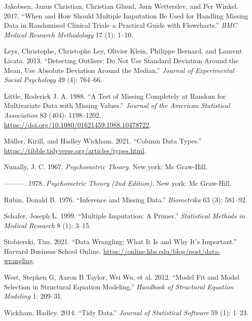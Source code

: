 \documentclass[
  letterpaper,
]{krantz}
\newlength{\cslhangindent}
\newenvironment{CSLReferences}[2] %
 {\begin{list}{}{%
  \setlength{\itemindent}{0pt}
  \setlength{\leftmargin}{0pt}
  \setlength{\parsep}{0pt}
  \ifodd #1
   \setlength{\leftmargin}{\cslhangindent}
   \setlength{\itemindent}{-1\cslhangindent}
  \fi
  \setlength{\itemsep}{#2\baselineskip}}}
 {\end{list}}
\begin{document}
\begin{CSLReferences}{1}{0}
Jakobsen, Janus Christian, Christian Gluud, Jørn Wetterslev, and Per
Winkel. 2017. {``When and How Should Multiple Imputation Be Used for
Handling Missing Data in Randomised Clinical Trials--a Practical Guide
with Flowcharts.''} \emph{BMC Medical Research Methodology} 17 (1):
1--10.

Leys, Christophe, Christophe Ley, Olivier Klein, Philippe Bernard, and
Laurent Licata. 2013. {``Detecting Outliers: Do Not Use Standard
Deviation Around the Mean, Use Absolute Deviation Around the Median.''}
\emph{Journal of Experimental Social Psychology} 49 (4): 764--66.

Little, Roderick J. A. 1988. {``A Test of Missing Completely at Random
for Multivariate Data with Missing Values.''} \emph{Journal of the
American Statistical Association} 83 (404): 1198--1202.
\url{https://doi.org/10.1080/01621459.1988.10478722}.

Müller, Kirill, and Hadley Wickham. 2021. {``Column Data Types.''}
\url{https://tibble.tidyverse.org/articles/types.html}.

Nunally, J. C. 1967. \emph{Psychometric Theory}. New york: Mc Graw-Hill.

---------. 1978. \emph{Psychometric Theory (2nd Edition)}. New york: Mc
Graw-Hill.

Rubin, Donald B. 1976. {``Inference and Missing Data.''}
\emph{Biometrika} 63 (3): 581--92.

Schafer, Joseph L. 1999. {``Multiple Imputation: A Primer.''}
\emph{Statistical Methods in Medical Research} 8 (1): 3--15.

Stobierski, Tim. 2021. {``Data Wrangling: What It Is and Why It's
Important.''} Harvard Business School Online.
\url{https://online.hbs.edu/blog/post/data-wrangling}.

West, Stephen G, Aaron B Taylor, Wei Wu, et al. 2012. {``Model Fit and
Model Selection in Structural Equation Modeling.''} \emph{Handbook of
Structural Equation Modeling} 1: 209--31.

Wickham, Hadley. 2014. {``Tidy Data.''} \emph{Journal of Statistical
Software} 59 (1): 1--23.


\end{CSLReferences}
\end{document}
